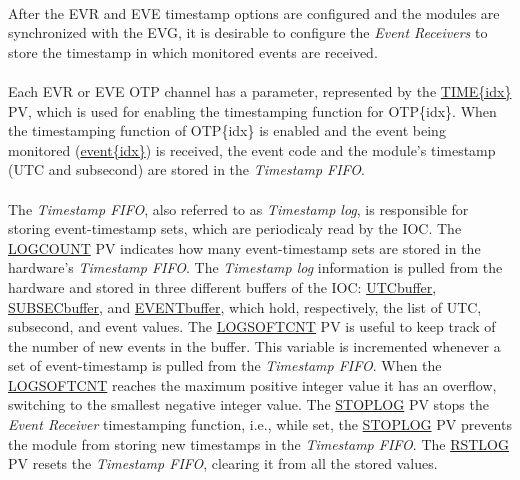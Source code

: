 \documentclass[openany]{article}
\begin{document}
		\paragraph{} After the EVR and EVE timestamp options are configured and the modules are synchronized with the EVG, it is desirable to configure the \emph{Event Receivers} to store the timestamp in which monitored events are received.
		\paragraph{} Each EVR or EVE OTP channel has a parameter, represented by the \hyperref[pvgroup:evre-otp]{TIME\{idx\}} PV, which is used for enabling the timestamping function for OTP\{idx\}. When the timestamping function of OTP\{idx\} is enabled and the event being monitored (\hyperref[pvgroup:evre-otp]{event\{idx\}}) is received, the event code and the module's timestamp (UTC and subsecond) are stored in the \emph{Timestamp FIFO}.
		\paragraph{} The \emph{Timestamp FIFO}, also referred to as \emph{Timestamp log}, is responsible for storing event-timestamp sets, which are periodicaly read by the IOC. The \hyperref[pvgroup:evre-timestamp-log]{LOGCOUNT} PV indicates how many event-timestamp sets are stored in the hardware's \emph{Timestamp FIFO}. The \emph{Timestamp log} information is pulled from the hardware and stored in three different buffers of the IOC: \hyperref[pvgroup:evre-timestamp-log]{UTCbuffer}, \hyperref[pvgroup:evre-timestamp-log]{SUBSECbuffer}, and \hyperref[pvgroup:evre-timestamp-log]{EVENTbuffer}, which hold, respectively, the list of UTC, subsecond, and event values. The \hyperref[pvgroup:evre-timestamp-log]{LOGSOFTCNT} PV is useful to keep track of the number of new events in the buffer. This variable is incremented whenever a set of event-timestamp is pulled from the \emph{Timestamp FIFO}. When the \hyperref[pvgroup:evre-timestamp-log]{LOGSOFTCNT} reaches the maximum positive integer value it has an overflow, switching to the smallest negative integer value. The \hyperref[pvgroup:evre-timestamp-log]{STOPLOG} PV stops the \emph{Event Receiver} timestamping function, i.e., while set, the \hyperref[pvgroup:evre-timestamp-log]{STOPLOG} PV prevents the module from storing new timestamps in the \emph{Timestamp FIFO}. The \hyperref[pvgroup:evre-timestamp-log]{RSTLOG} PV resets the \emph{Timestamp FIFO}, clearing it from all the stored values.
\end{document}
